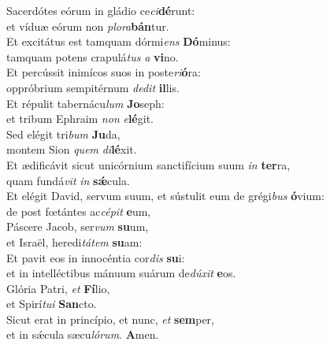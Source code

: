 \evenverse Sacerdótes eórum in gládio ce\textit{ci}\textbf{dé}runt:~\*\\
\evenverse et víduæ eórum non \textit{plo}\textit{ra}\textbf{bán}tur.\\
\oddverse Et excitátus est tamquam dórmi\textit{ens} \textbf{Dó}minus:~\*\\
\oddverse tamquam potens crapulá\textit{tus} \textit{a} \textbf{vi}no.\\
\evenverse Et percússit inimícos suos in poste\textit{ri}\textbf{ó}ra:~\*\\
\evenverse oppróbrium sempitérnum \textit{de}\textit{dit} \textbf{il}lis.\\
\oddverse Et répulit tabernácu\textit{lum} \textbf{Jo}seph:~\*\\
\oddverse et tribum Ephraim \textit{non} \textit{e}\textbf{lé}git.\\
\evenverse Sed elégit tri\textit{bum} \textbf{Ju}da,~\*\\
\evenverse montem Sion \textit{quem} \textit{di}\textbf{lé}xit.\\
\oddverse Et ædificávit sicut unicórnium sanctifícium suum \textit{in} \textbf{ter}ra,~\*\\
\oddverse quam fundá\textit{vit} \textit{in} \textbf{sǽ}cula.\\
\evenverse Et elégit David, servum suum, et sústulit eum de grégi\textit{bus} \textbf{ó}vium:~\*\\
\evenverse de post fœtántes ac\textit{cé}\textit{pit} \textbf{e}um,\\
\oddverse Páscere Jacob, ser\textit{vum} \textbf{su}um,~\*\\
\oddverse et Israël, heredi\textit{tá}\textit{tem} \textbf{su}am:\\
\evenverse Et pavit eos in innocéntia cor\textit{dis} \textbf{su}i:~\*\\
\evenverse et in intelléctibus mánuum suárum de\textit{dú}\textit{xit} \textbf{e}os.\\
\oddverse Glória Patri, \textit{et} \textbf{Fí}lio,~\*\\
\oddverse et Spirí\textit{tu}\textit{i} \textbf{San}cto.\\
\evenverse Sicut erat in princípio, et nunc, \textit{et} \textbf{sem}per,~\*\\
\evenverse et in sǽcula sæcu\textit{ló}\textit{rum}. \textbf{A}men.\\
